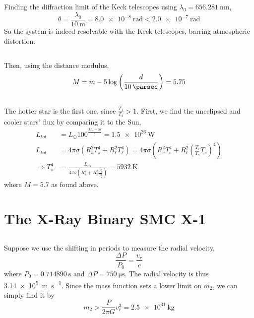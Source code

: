 \documentclass{article}
\begin{document}
\subsection{}

Finding the diffraction limit of the Keck telescopes using \(\lambda_0 = \SI{656.281}{\nano\meter}\),
\begin{equation}
    \theta = \frac{\lambda_0}{\SI{10}{\meter}} = \SI{8.0e-8}{\radian} < \SI{2.0e-7}{\radian}
\end{equation}
So the system is indeed resolvable with the Keck telescopes, barring atmospheric distortion.

\subsection{}

Then, using the distance modulus,
\begin{equation}
    M = m - 5 \log\left(\frac{d}{\SI{10}{\parsec}}\right) = \num{5.75}
\end{equation}

\subsection{}

The hotter star is the first one, since \(\frac{T_1}{T_2} > 1\).
First, we find the uneclipsed and cooler stars' flux by comparing it to the Sun,
\begin{align}
    L_{tot} &= L_\odot 100^{\frac{M_\odot - M}{5}} = \SI{1.5e+26}{\watt} \\
    L_{tot} &= 4 \pi \sigma (R_s^2 T_s^4 + R_\ell^2 T_\ell^4) = 4 \pi \sigma \left(R_s^2 T_s^4 + R_\ell^2 \left(\frac{T_\ell}{T_s} T_s\right)^4\right) \\
    \Rightarrow T_s^4 &= \frac{L_{tot}}{4 \pi \sigma \left(R_s^2 + R_\ell^2 \frac{T_\ell^4}{T_s^4}\right)} = \SI{5932}{\kelvin}
\end{align}
where \(M = 5.7\) as found above.

\section{The X-Ray Binary SMC X-1}

\subsection{}

Suppose we use the shifting in periods to measure the radial velocity,
\begin{equation}
    \frac{\Delta P}{P_0} = \frac{v_r}{c}
\end{equation}
where \(P_0 = \SI{0.714890}{\second}\) and \(\Delta P = \SI{750}{\micro\second}\).
The radial velocity is thus \SI{3.14e+5}{\meter\per\second}.
Since the mass function sets a lower limit on \(m_2\), we can simply find it by
\begin{equation}
    m_2 > \frac{P}{2 \pi G} v_r^3 = \SI{2.5e+31}{\kilogram}
\end{equation}
\end{document}
